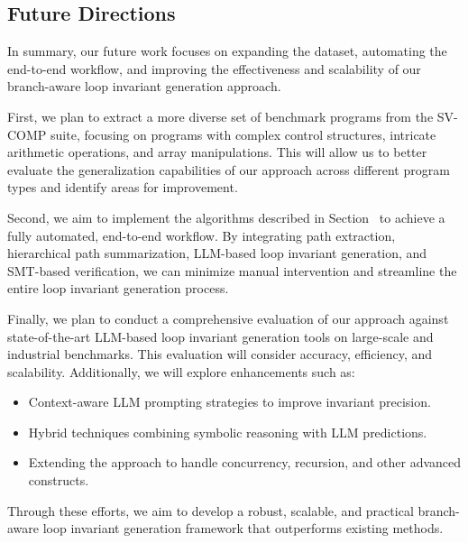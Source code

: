 \subsection{Future Directions}

In summary, our future work focuses on expanding the dataset, automating the end-to-end workflow, and improving the effectiveness and scalability of our branch-aware loop invariant generation approach.

First, we plan to extract a more diverse set of benchmark programs from the SV-COMP suite, focusing on programs with complex control structures, intricate arithmetic operations, and array manipulations. This will allow us to better evaluate the generalization capabilities of our approach across different program types and identify areas for improvement.

Second, we aim to implement the algorithms described in Section~ to achieve a fully automated, end-to-end workflow. By integrating path extraction, hierarchical path summarization, LLM-based loop invariant generation, and SMT-based verification, we can minimize manual intervention and streamline the entire loop invariant generation process.

Finally, we plan to conduct a comprehensive evaluation of our approach against state-of-the-art LLM-based loop invariant generation tools on large-scale and industrial benchmarks. This evaluation will consider accuracy, efficiency, and scalability. Additionally, we will explore enhancements such as:
\begin{itemize}
    \item Context-aware LLM prompting strategies to improve invariant precision.
    \item Hybrid techniques combining symbolic reasoning with LLM predictions.
    \item Extending the approach to handle concurrency, recursion, and other advanced constructs.
\end{itemize}

Through these efforts, we aim to develop a robust, scalable, and practical branch-aware loop invariant generation framework that outperforms existing methods.

